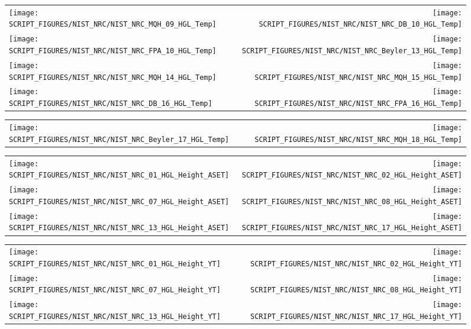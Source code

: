 \begin{figure}[p]
\begin{tabular*}{\textwidth}{l@{\extracolsep{\fill}}r}
\texttt{[image: SCRIPT\_FIGURES/NIST\_NRC/NIST\_NRC\_MQH\_09\_HGL\_Temp]} &
\texttt{[image: SCRIPT\_FIGURES/NIST\_NRC/NIST\_NRC\_DB\_10\_HGL\_Temp]} \\
\texttt{[image: SCRIPT\_FIGURES/NIST\_NRC/NIST\_NRC\_FPA\_10\_HGL\_Temp]} &
\texttt{[image: SCRIPT\_FIGURES/NIST\_NRC/NIST\_NRC\_Beyler\_13\_HGL\_Temp]} \\
\texttt{[image: SCRIPT\_FIGURES/NIST\_NRC/NIST\_NRC\_MQH\_14\_HGL\_Temp]} &
\texttt{[image: SCRIPT\_FIGURES/NIST\_NRC/NIST\_NRC\_MQH\_15\_HGL\_Temp]} \\
\texttt{[image: SCRIPT\_FIGURES/NIST\_NRC/NIST\_NRC\_DB\_16\_HGL\_Temp]} &
\texttt{[image: SCRIPT\_FIGURES/NIST\_NRC/NIST\_NRC\_FPA\_16\_HGL\_Temp]}
\end{tabular*}
\end{figure}

\begin{figure}[p]
\begin{tabular*}{\textwidth}{l@{\extracolsep{\fill}}r}
\texttt{[image: SCRIPT\_FIGURES/NIST\_NRC/NIST\_NRC\_Beyler\_17\_HGL\_Temp]} &
\texttt{[image: SCRIPT\_FIGURES/NIST\_NRC/NIST\_NRC\_MQH\_18\_HGL\_Temp]}
\end{tabular*}
\end{figure}

\begin{figure}[p]
\begin{tabular*}{\textwidth}{l@{\extracolsep{\fill}}r}
\texttt{[image: SCRIPT\_FIGURES/NIST\_NRC/NIST\_NRC\_01\_HGL\_Height\_ASET]} &
\texttt{[image: SCRIPT\_FIGURES/NIST\_NRC/NIST\_NRC\_02\_HGL\_Height\_ASET]} \\
\texttt{[image: SCRIPT\_FIGURES/NIST\_NRC/NIST\_NRC\_07\_HGL\_Height\_ASET]} &
\texttt{[image: SCRIPT\_FIGURES/NIST\_NRC/NIST\_NRC\_08\_HGL\_Height\_ASET]} \\
\texttt{[image: SCRIPT\_FIGURES/NIST\_NRC/NIST\_NRC\_13\_HGL\_Height\_ASET]} &
\texttt{[image: SCRIPT\_FIGURES/NIST\_NRC/NIST\_NRC\_17\_HGL\_Height\_ASET]}
\end{tabular*}
\end{figure}

\begin{figure}[p]
\begin{tabular*}{\textwidth}{l@{\extracolsep{\fill}}r}
\texttt{[image: SCRIPT\_FIGURES/NIST\_NRC/NIST\_NRC\_01\_HGL\_Height\_YT]} &
\texttt{[image: SCRIPT\_FIGURES/NIST\_NRC/NIST\_NRC\_02\_HGL\_Height\_YT]} \\
\texttt{[image: SCRIPT\_FIGURES/NIST\_NRC/NIST\_NRC\_07\_HGL\_Height\_YT]} &
\texttt{[image: SCRIPT\_FIGURES/NIST\_NRC/NIST\_NRC\_08\_HGL\_Height\_YT]} \\
\texttt{[image: SCRIPT\_FIGURES/NIST\_NRC/NIST\_NRC\_13\_HGL\_Height\_YT]} &
\texttt{[image: SCRIPT\_FIGURES/NIST\_NRC/NIST\_NRC\_17\_HGL\_Height\_YT]}
\end{tabular*}
\end{figure}

